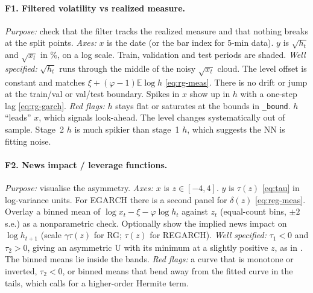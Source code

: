\documentclass[11pt]{article}
\newcommand{\E}{\mathbb{E}}
\begin{document}
\paragraph{F1. Filtered volatility vs realized measure.}
\emph{Purpose:} check that the filter tracks the realized measure and that nothing breaks at the split points.
\emph{Axes:} $x$ is the date (or the bar index for 5-min data). $y$ is $\sqrt{h_t}$ and $\sqrt{x_t}$ in \%, on a log scale.
Train, validation and test periods are shaded.
\emph{Well specified:} $\sqrt{h_t}$ runs through the middle of the noisy $\sqrt{x_t}$ cloud. The level
offset is constant and matches $\xi+(\varphi-1)\E\log h$ \eqref{eq:rg-meas}. There is no drift or jump at
the train/val or val/test boundary. Spikes in $x$ show up in $h$ with a one-step lag
\eqref{eq:rg-garch}.
\emph{Red flags:} $h$ stays flat or saturates at the bounds in \texttt{\_bound}. $h$ ``leads'' $x$,
which signals look-ahead. The level changes systematically out of sample. Stage~2 $h$ is much
spikier than stage~1 $h$, which suggests the NN is fitting noise.

\paragraph{F2. News impact / leverage functions.}
\emph{Purpose:} visualise the asymmetry.
\emph{Axes:} $x$ is $z\in[-4,4]$. $y$ is $\tau(z)$ \eqref{eq:tau} in log-variance units. For EGARCH there is a
second panel for $\delta(z)$ \eqref{eq:reg-meas}. Overlay a binned mean of $\log x_t-\xi-\varphi\log h_t$
against $z_t$ (equal-count bins, $\pm2$\,s.e.) as a nonparametric check. Optionally show the
implied news impact on $\log h_{t+1}$ (scale $\gamma\tau(z)$ for RG; $\tau(z)$ for REGARCH).
\emph{Well specified:} $\tau_1<0$ and $\tau_2>0$, giving an asymmetric U with its minimum at a
slightly positive $z$, as in \cite{HHS2012,HH2016}. The binned means lie inside the bands.
\emph{Red flags:} a curve that is monotone or inverted, $\tau_2<0$, or binned means that bend away
from the fitted curve in the tails, which calls for a higher-order Hermite term.
\end{document}
